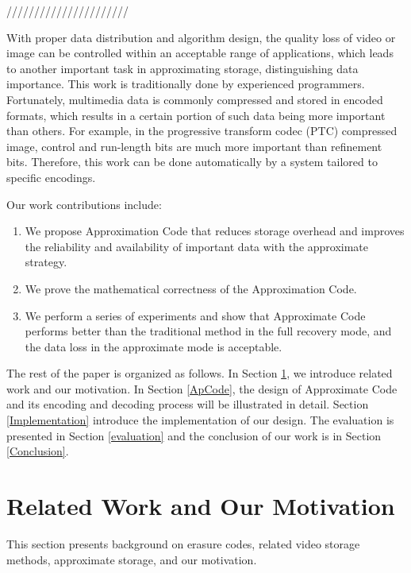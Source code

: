 \documentclass[sigconf]{acmart}
\begin{document}
//////////////////////

With proper data distribution and algorithm design, the quality loss of video or image can be controlled within an acceptable range of applications, which leads to another important task in approximating storage, distinguishing data importance.
This work is traditionally done by experienced programmers. Fortunately, multimedia data is commonly compressed and stored in encoded formats, which results in a certain portion of such data being more important than others. For example, in the progressive transform codec (PTC) compressed image, control and run-length bits are much more important than refinement bits. Therefore, this work can be done automatically by a system tailored to specific encodings.

Our work contributions include:
\begin{enumerate}
\item We propose Approximation Code that reduces storage overhead and improves the reliability and availability of important data with the approximate strategy.
\item We prove the mathematical correctness of the Approximation Code.
\item We perform a series of experiments and show that Approximate Code performs better than the traditional method in the full recovery mode, and the data loss in the approximate mode is acceptable.
\end{enumerate}

The rest of the paper is organized as follows. In Section \ref{RelatedWork}, we introduce related work and our motivation. 
In Section \ref{ApCode}, the design of Approximate Code and its encoding and decoding process will be illustrated in detail. 
Section \ref{Implementation} introduce the implementation of our design.
The evaluation is presented in Section \ref{evaluation} and the conclusion of our work is in Section \ref{Conclusion}. 


\section{Related Work and Our Motivation}\label{RelatedWork}
This section presents background on erasure codes, related video storage methods, approximate storage, and our motivation.
\end{document}
